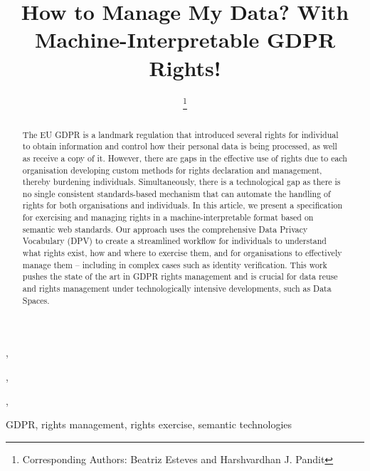 \documentclass{IOS-Book-Article}     %
\begin{document}
\pagestyle{plain}
\begin{frontmatter}          %
\title{How to Manage My Data? With Machine-Interpretable GDPR Rights!}

\author[A]{ 
\thanks{Corresponding Authors: Beatriz Esteves  and Harshvardhan J. Pandit }},
\author[B]{ },
\author[C]{ },
\author[D]{ }
\address[A]{IDLab, Ghent University -- imec, Ghent, Belgium}
\address[B]{ADAPT Centre, Dublin City University, Dublin, Ireland}
\address[C]{Signatu AS, Oslo, Norway}
\address[D]{ADAPT Centre, Dublin City University, and Uniphar PLC, Dublin, Ireland}

\begin{abstract}
The EU GDPR is a landmark regulation that introduced several rights for individual to obtain information and control how their personal data is being processed, as well as receive a copy of it. However, there are gaps in the effective use of rights due to each organisation developing custom methods for rights declaration and management, thereby burdening individuals. Simultaneously, there is a technological gap as there is no single consistent standards-based mechanism that can automate the handling of rights for both organisations and individuals.
In this article, we present a specification for exercising and managing rights in a machine-interpretable format based on semantic web standards.
Our approach uses the comprehensive Data Privacy Vocabulary (DPV) to create a streamlined workflow for individuals to understand what rights exist, how and where to exercise them, and for organisations to effectively manage them -- including in complex cases such as identity verification.
This work pushes the state of the art in GDPR rights management and is crucial for data reuse and rights management under technologically intensive developments, such as Data Spaces.
\end{abstract}

\begin{keyword}
GDPR, rights management, rights exercise, semantic technologies
\end{keyword}

\end{frontmatter}
\end{document}
